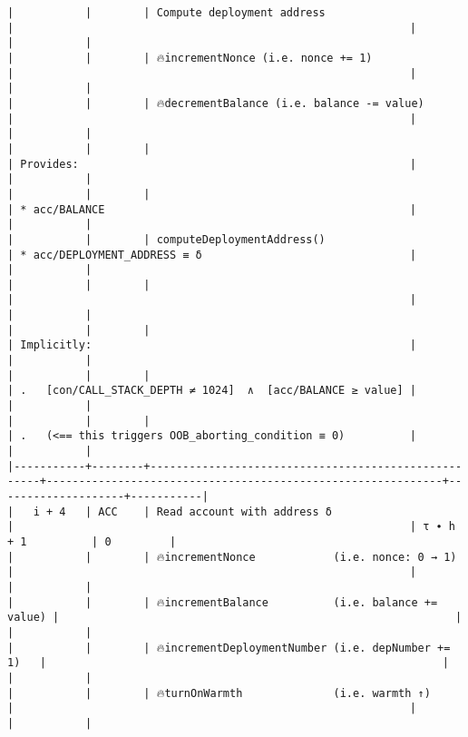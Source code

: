 \documentclass[varwidth=\maxdimen,margin=0.5cm,multi={verbatim}]{standalone}
\begin{document}
\begin{verbatim}
|           |        | Compute deployment address                          |                                                             |                    |           |
|           |        | 🔥incrementNonce (i.e. nonce += 1)                  |                                                             |                    |           |
|           |        | 🔥decrementBalance (i.e. balance -= value)          |                                                             |                    |           |
|           |        |                                                     | Provides:                                                   |                    |           |
|           |        |                                                     | * acc/BALANCE                                               |                    |           |
|           |        | computeDeploymentAddress()                          | * acc/DEPLOYMENT_ADDRESS ≡ δ                                |                    |           |
|           |        |                                                     |                                                             |                    |           |
|           |        |                                                     | Implicitly:                                                 |                    |           |
|           |        |                                                     | .   [con/CALL_STACK_DEPTH ≠ 1024]  ∧  [acc/BALANCE ≥ value] |                    |           |
|           |        |                                                     | .   (<== this triggers OOB_aborting_condition ≡ 0)          |                    |           |
|-----------+--------+-----------------------------------------------------+-------------------------------------------------------------+--------------------+-----------|
|   i + 4   | ACC    | Read account with address δ                         |                                                             | τ ∙ h + 1          | 0         |
|           |        | 🔥incrementNonce            (i.e. nonce: 0 → 1)     |                                                             |                    |           |
|           |        | 🔥incrementBalance          (i.e. balance += value) |                                                             |                    |           |
|           |        | 🔥incrementDeploymentNumber (i.e. depNumber += 1)   |                                                             |                    |           |
|           |        | 🔥turnOnWarmth              (i.e. warmth ↑)         |                                                             |                    |           |

\end{verbatim}
\end{document}
